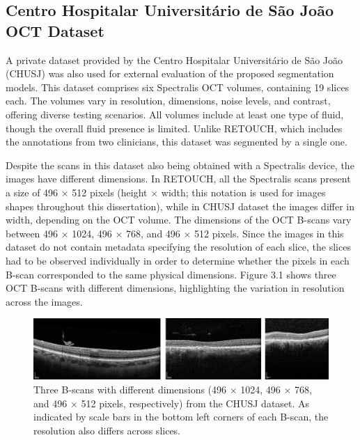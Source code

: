 \subsection{Centro Hospitalar Universitário de São João OCT Dataset}

A private dataset provided by the Centro Hospitalar Universitário de São João (CHUSJ) was also used for external evaluation of the proposed segmentation models. This dataset comprises six Spectralis OCT volumes, containing 19 slices each. The volumes vary in resolution, dimensions, noise levels, and contrast, offering diverse testing scenarios. All volumes include at least one type of fluid, though the overall fluid presence is limited. Unlike RETOUCH, which includes the annotations from two clinicians, this dataset was segmented by a single one.
\par
Despite the scans in this dataset also being obtained with a Spectralis device, the images have different dimensions. In RETOUCH, all the Spectralis scans present a size of 496 $\times$ 512 pixels (height $\times$ width; this notation is used for images shapes throughout this dissertation), while in CHUSJ dataset the images differ in width, depending on the OCT volume. The dimensions of the OCT B-scans vary between 496 $\times$ 1024, 496 $\times$ 768, and 496 $\times$ 512 pixels. Since the images in this dataset do not contain metadata specifying the resolution of each slice, the slices had to be observed individually in order to determine whether the pixels in each B-scan corresponded to the same physical dimensions. Figure 3.1 shows three OCT B-scans with different dimensions, highlighting the variation in resolution across the images.

\begin{figure}[!ht]
	\centering
	\includegraphics[width=1.0\linewidth]{figures/CHUSJDifferentResolutions.png}
	\caption{Three B-scans with different dimensions (496 $\times$ 1024, 496 $\times$ 768, and 496 $\times$ 512 pixels, respectively) from the CHUSJ dataset. As indicated by scale bars in the bottom left corners of each B-scan, the resolution also differs across slices.}
	\label{fig:CHUSJDifferentResolutions}
\end{figure}

